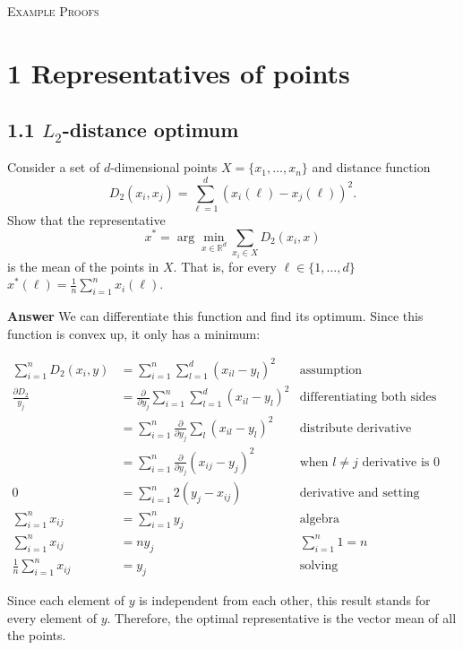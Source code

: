 \documentclass[11pt]{article}
\newcommand{\task}[1]{\section*{\normalsize #1}}
\begin{document}
\begin{center}
    {\Large \textsc{Example Proofs}}
\end{center}

\task{1 Representatives of points}


\subsection*{1.1 $L_2$-distance optimum}
Consider a set of $d$-dimensional points $X=\{x_1,\ldots , x_n\}$ and distance function 
$$ D_2(x_i,x_j) = \sum_{\ell=1}^d\left(x_i(\ell)-x_j(\ell)\right)^2.$$ Show that the representative 
$$
x^\ast = \arg\min_{x\in \mathbb{R}^d}\sum_{x_i\in X}D_2(x_i,x)
$$
is the mean of the points in $X$. That is, for every $\ell\in\{1,\ldots ,d\}$
$x^\ast(\ell)=\frac{1}{n}\sum_{i=1}^n x_i(\ell)$.\newline\newline

\noindent\textbf{Answer}
We can differentiate this function and find its optimum. Since this function is convex up, it only has a minimum:

\begin{align*}
\sum\limits_{i=1}^n D_2(x_i,y) &= \sum\limits_{i=1}^n \sum\limits_{l=1}^d (x_{il} - y_l)^2 &\text{assumption}\\
\frac{\partial D_2}{y_j} &= \frac{\partial}{\partial y_j} \sum\limits_{i=1}^n \sum\limits_{l=1}^d (x_{il} - y_l)^2 &\text{differentiating both sides}\\
  &= \sum\limits_{i=1}^n \frac{\partial}{\partial y_j}\sum\limits_{l} (x_{il} - y_l)^2 &\text{distribute derivative operator}\\
  &= \sum\limits_{i=1}^n \frac{\partial}{\partial y_j} (x_{ij} - y_j)^2 &\text{when }l\neq j\text{ derivative is 0}\\
0 &= \sum\limits_{i=1}^n 2(y_j - x_{ij}) &\text{derivative and setting derivative to 0}\\
\sum\limits_{i=1}^n x_{ij} &= \sum\limits_{i=1}^n y_j &\text{algebra}\\
\sum\limits_{i=1}^n x_{ij} &= ny_j &\sum\limits_{i=1}^n 1 = n\\
\frac{1}{n}\sum\limits_{i=1}^n x_{ij} &= y_j &\text{solving}
\end{align*}

Since each element of $y$ is independent from each other, this result stands for every element of $y$. Therefore, the optimal representative is the vector mean of all the points.\newpage
\end{document}
